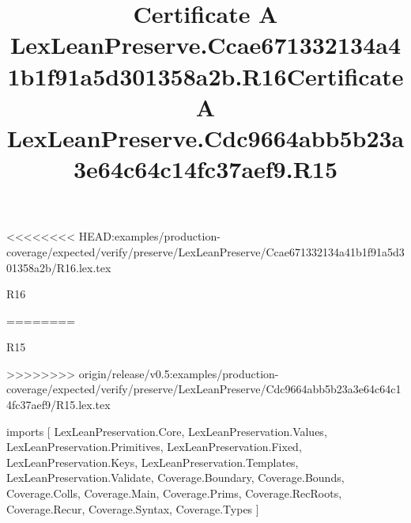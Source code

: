 <<<<<<<< HEAD:examples/production-coverage/expected/verify/preserve/LexLeanPreserve/Ccae671332134a41b1f91a5d301358a2b/R16.lex.tex
\begin{lexlean}{R16}
\title{Certificate A LexLeanPreserve.Ccae671332134a41b1f91a5d301358a2b.R16}
========
\begin{lexlean}{R15}
\title{Certificate A LexLeanPreserve.Cdc9664abb5b23a3e64c64c14fc37aef9.R15}
>>>>>>>> origin/release/v0.5:examples/production-coverage/expected/verify/preserve/LexLeanPreserve/Cdc9664abb5b23a3e64c64c14fc37aef9/R15.lex.tex
\begin{coremodule}
imports [
  LexLeanPreservation.Core,
  LexLeanPreservation.Values,
  LexLeanPreservation.Primitives,
  LexLeanPreservation.Fixed,
  LexLeanPreservation.Keys,
  LexLeanPreservation.Templates,
  LexLeanPreservation.Validate,
  Coverage.Boundary,
  Coverage.Bounds,
  Coverage.Colls,
  Coverage.Main,
  Coverage.Prims,
  Coverage.RecRoots,
  Coverage.Recur,
  Coverage.Syntax,
  Coverage.Types
]


\end{coremodule}
\end{lexlean}
\end{lexlean}
